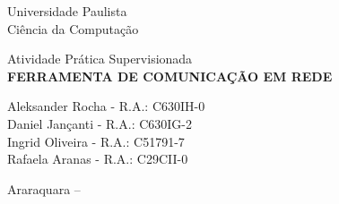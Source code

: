 \begin{center}
	\Huge Universidade Paulista\\
	\large Ciência da Computação
	
	\vfill
	
	\large Atividade Prática Supervisionada\\
	\textbf{\MakeUppercase{Ferramenta de comunicação em rede}}
	
	\bigskip
	\bigskip
	
	\normalsize{
		Aleksander Rocha - R.A.: C630IH-0\\
		Daniel Jançanti - R.A.: C630IG-2\\
		Ingrid Oliveira - R.A.: C51791-7\\
		Rafaela Aranas - R.A.: C29CII-0\\	
	}
	
	\vfill
	
	Araraquara -- \the\year

\end{center}

\thispagestyle{empty}